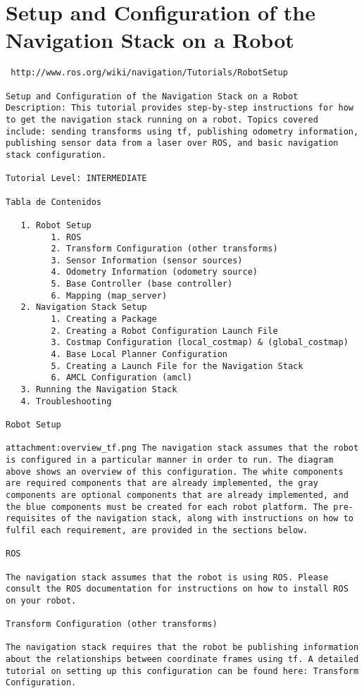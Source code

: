 \chapter{Setup and Configuration of the Navigation Stack on a Robot}

\begin{verbatim}
 http://www.ros.org/wiki/navigation/Tutorials/RobotSetup

Setup and Configuration of the Navigation Stack on a Robot
Description: This tutorial provides step-by-step instructions for how to get the navigation stack running on a robot. Topics covered include: sending transforms using tf, publishing odometry information, publishing sensor data from a laser over ROS, and basic navigation stack configuration.

Tutorial Level: INTERMEDIATE

Tabla de Contenidos

   1. Robot Setup
         1. ROS
         2. Transform Configuration (other transforms)
         3. Sensor Information (sensor sources)
         4. Odometry Information (odometry source)
         5. Base Controller (base controller)
         6. Mapping (map_server)
   2. Navigation Stack Setup
         1. Creating a Package
         2. Creating a Robot Configuration Launch File
         3. Costmap Configuration (local_costmap) & (global_costmap)
         4. Base Local Planner Configuration
         5. Creating a Launch File for the Navigation Stack
         6. AMCL Configuration (amcl)
   3. Running the Navigation Stack
   4. Troubleshooting

Robot Setup

attachment:overview_tf.png The navigation stack assumes that the robot is configured in a particular manner in order to run. The diagram above shows an overview of this configuration. The white components are required components that are already implemented, the gray components are optional components that are already implemented, and the blue components must be created for each robot platform. The pre-requisites of the navigation stack, along with instructions on how to fulfil each requirement, are provided in the sections below.

ROS

The navigation stack assumes that the robot is using ROS. Please consult the ROS documentation for instructions on how to install ROS on your robot.

Transform Configuration (other transforms)

The navigation stack requires that the robot be publishing information about the relationships between coordinate frames using tf. A detailed tutorial on setting up this configuration can be found here: Transform Configuration.


\end{verbatim}

